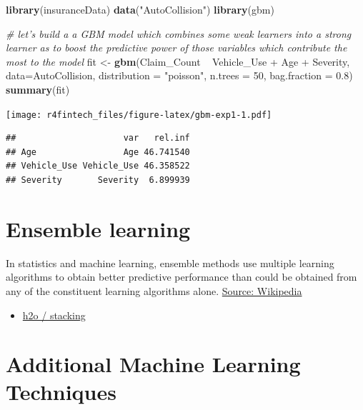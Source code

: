 \documentclass[]{book}
\newenvironment{Shaded}{\begin{snugshade}}{\end{snugshade}}
\newcommand{\KeywordTok}[1]{\textcolor[rgb]{0.13,0.29,0.53}{\textbf{{#1}}}}
\newcommand{\DataTypeTok}[1]{\textcolor[rgb]{0.13,0.29,0.53}{{#1}}}
\newcommand{\DecValTok}[1]{\textcolor[rgb]{0.00,0.00,0.81}{{#1}}}
\newcommand{\FloatTok}[1]{\textcolor[rgb]{0.00,0.00,0.81}{{#1}}}
\newcommand{\StringTok}[1]{\textcolor[rgb]{0.31,0.60,0.02}{{#1}}}
\newcommand{\CommentTok}[1]{\textcolor[rgb]{0.56,0.35,0.01}{\textit{{#1}}}}
\newcommand{\NormalTok}[1]{{#1}}
\providecommand{\tightlist}{%
  \setlength{\itemsep}{0pt}\setlength{\parskip}{0pt}}
\begin{document}
\begin{Shaded}
\begin{Highlighting}[]
\KeywordTok{library}\NormalTok{(insuranceData)}
\KeywordTok{data}\NormalTok{(}\StringTok{"AutoCollision"}\NormalTok{)}
\KeywordTok{library}\NormalTok{(gbm)}

\CommentTok{# let's build a a GBM model which combines some weak learners into a strong learner as to boost the predictive power of those variables which contribute the most to the model}
\NormalTok{fit <-}\StringTok{ }\KeywordTok{gbm}\NormalTok{(Claim_Count ~}\StringTok{ }\NormalTok{Vehicle_Use +}\StringTok{ }\NormalTok{Age +}\StringTok{ }\NormalTok{Severity, }\DataTypeTok{data=}\NormalTok{AutoCollision, }\DataTypeTok{distribution =} \StringTok{"poisson"}\NormalTok{, }\DataTypeTok{n.trees =} \DecValTok{50}\NormalTok{, }\DataTypeTok{bag.fraction =} \FloatTok{0.8}\NormalTok{)}
\KeywordTok{summary}\NormalTok{(fit)}
\end{Highlighting}
\end{Shaded}

\texttt{[image: r4fintech\_files/figure-latex/gbm-exp1-1.pdf]}

\begin{verbatim}
##                     var   rel.inf
## Age                 Age 46.741540
## Vehicle_Use Vehicle_Use 46.358522
## Severity       Severity  6.899939
\end{verbatim}

\section{\texorpdfstring{\textbf{Ensemble
learning}}{Ensemble learning}}\label{ensemble-learning}

In statistics and machine learning, ensemble methods use multiple
learning algorithms to obtain better predictive performance than could
be obtained from any of the constituent learning algorithms alone.
\href{https://en.wikipedia.org/wiki/Ensemble_learning}{Source:
Wikipedia}

\begin{itemize}
\tightlist
\item
  \href{http://blog.revolutionanalytics.com/2014/04/a-dive-into-h2o.html}{h2o
  / stacking}
\end{itemize}

\section{\texorpdfstring{\textbf{Additional Machine Learning
Techniques}}{Additional Machine Learning Techniques}}\label{additional-machine-learning-techniques}
\end{document}
